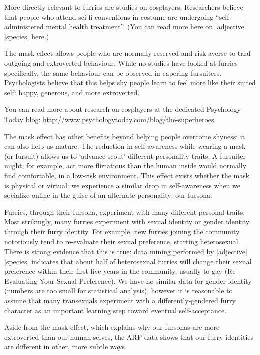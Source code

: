 More directly relevant to furries are studies on cosplayers. Researchers believe that people who attend sci-fi conventions in costume are undergoing ``self-administered mental health treatment''. (You can read more here on [adjective][species] here.)

The mask effect allows people who are normally reserved and risk-averse to trial outgoing and extroverted behaviour. While no studies have looked at furries specifically, the same behaviour can be observed in capering fursuiters. Psychologists believe that this helps shy people learn to feel more like their suited self: happy, generous, and more extroverted.

You can read more about research on cosplayers at the dedicated Psychology Today blog: http://www.psychologytoday.com/blog/the-superheroes.

The mask effect has other benefits beyond helping people overcome shyness: it can also help us mature. The reduction in self-awareness while wearing a mask (or fursuit) allows us to ‘advance scout' different personality traits. A fursuiter might, for example, act more flirtatious than the human inside would normally find comfortable, in a low-risk environment. This effect exists whether the mask is physical or virtual: we experience a similar drop in self-awareness when we socialize online in the guise of an alternate personality: our fursona.

Furries, through their fursona, experiment with many different personal traits. Most strikingly, many furries experiment with sexual identity or gender identity through their furry identity. For example, new furries joining the community notoriously tend to re-evaluate their sexual preference, starting heterosexual. There is strong evidence that this is true: data mining performed by [adjective][species] indicates that about half of heterosexual furries will change their sexual preference within their first five years in the community, usually to gay (Re-Evaluating Your Sexual Preference). We have no similar data for gender identity (numbers are too small for statistical analysis), however it is reasonable to assume that many transexuals experiment with a differently-gendered furry character as an important learning step toward eventual self-acceptance.

Aside from the mask effect, which explains why our fursonas are more extroverted than our human selves, the ARP data shows that our furry identities are different in other, more subtle ways.


